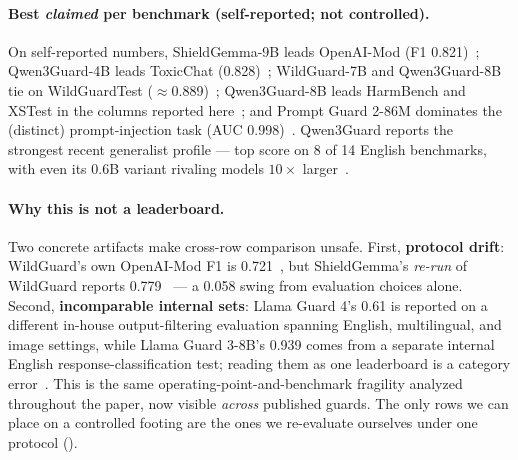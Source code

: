 \paragraph{Best \emph{claimed} per benchmark (self-reported; not controlled).}
On self-reported numbers, ShieldGemma-9B leads OpenAI-Mod (F1 0.821)~\cite{zeng2024shieldgemma}; Qwen3Guard-4B leads ToxicChat (0.828)~\cite{qwen3guard2025}; WildGuard-7B and Qwen3Guard-8B tie on WildGuardTest ($\approx$0.889)~\cite{han2024wildguard,qwen3guard2025}; Qwen3Guard-8B leads HarmBench and XSTest in the columns reported here~\cite{qwen3guard2025}; and Prompt Guard 2-86M dominates the (distinct) prompt-injection task (AUC 0.998)~\cite{meta2025promptguard2_86m}. Qwen3Guard reports the strongest recent generalist profile --- top score on 8 of 14 English benchmarks, with even its 0.6B variant rivaling models $10\times$ larger~\cite{qwen3guard2025}.

\paragraph{Why this is not a leaderboard.}
Two concrete artifacts make cross-row comparison unsafe. First, \textbf{protocol drift}: WildGuard's own OpenAI-Mod F1 is 0.721~\cite{han2024wildguard}, but ShieldGemma's \emph{re-run} of WildGuard reports 0.779~\cite{zeng2024shieldgemma} --- a 0.058 swing from evaluation choices alone. Second, \textbf{incomparable internal sets}: Llama Guard 4's 0.61 is reported on a different in-house output-filtering evaluation spanning English, multilingual, and image settings, while Llama Guard 3-8B's 0.939 comes from a separate internal English response-classification test; reading them as one leaderboard is a category error~\cite{meta2025llamaguard4,meta2024llamaguard3_8b}. This is the same operating-point-and-benchmark fragility analyzed throughout the paper, now visible \emph{across} published guards. The only rows we can place on a controlled footing are the ones we re-evaluate ourselves under one protocol ().
